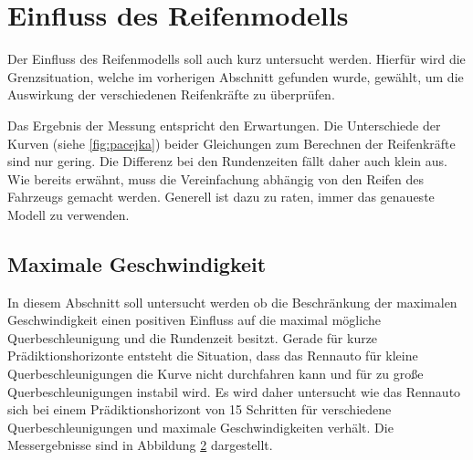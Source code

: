 \documentclass{like}
\begin{document}
\section{Einfluss des Reifenmodells}
Der Einfluss des Reifenmodells soll auch kurz untersucht werden. Hierfür wird die Grenzsituation, welche im vorherigen Abschnitt gefunden wurde, gewählt, um die Auswirkung der verschiedenen Reifenkräfte zu überprüfen.


\begin{figure}
	\centering
	\caption{}
	\label{fig:tireModelDiff}
\end{figure}

Das Ergebnis der Messung entspricht den Erwartungen. Die Unterschiede der Kurven (siehe \ref{fig:pacejka}) beider Gleichungen zum Berechnen der Reifenkräfte sind nur gering. Die Differenz bei den Rundenzeiten fällt daher auch klein aus. Wie bereits erwähnt, muss die Vereinfachung abhängig von den Reifen des Fahrzeugs gemacht werden. Generell ist dazu zu raten, immer das genaueste Modell zu verwenden.

\subsection{Maximale Geschwindigkeit}
In diesem Abschnitt soll untersucht werden ob die Beschränkung der maximalen Geschwindigkeit einen positiven Einfluss auf die maximal mögliche Querbeschleunigung und die Rundenzeit besitzt. Gerade für kurze Prädiktionshorizonte entsteht die Situation, dass das Rennauto für kleine Querbeschleunigungen die Kurve nicht durchfahren kann und für zu große Querbeschleunigungen instabil wird. Es wird daher untersucht wie das Rennauto sich bei einem Prädiktionshorizont von 15 Schritten für verschiedene Querbeschleunigungen und maximale Geschwindigkeiten verhält. Die Messergebnisse sind in Abbildung \ref{fig:maxSpeedBetaMax} dargestellt.


\begin{figure}
	\centering
	 
	\caption{}
	\label{fig:maxSpeedBetaMax}
\end{figure}
\end{document}
